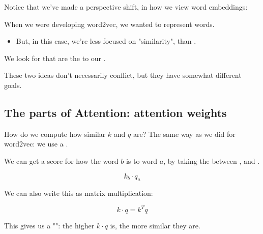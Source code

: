         \phantom{}

        Notice that we've made a perspective shift, in how we view word embeddings:\\

        \begin{concept}
            When we were developing word2vec, we wanted  to represent  words.

            \begin{itemize}
                \item But, in this case, we're less focused on "similarity", than .
            \end{itemize}

            We look for  that are the  to our .

        \end{concept}

        These two ideas don't necessarily conflict, but they have somewhat different goals.

    \phantom{}

    \subsection{The parts of Attention: attention weights}

        How do we compute how similar $k$ and $q$ are? The same way as we did for word2vec: we use a .\\

        \begin{kequation}
            We can get a score for how  the word $b$ is to word $a$, by taking the  between , and .

            \begin{equation*}
                k_b \cdot q_a  
            \end{equation*}

            We can also write this as matrix multiplication:

            \begin{equation*}
                k \cdot q = k^Tq
            \end{equation*}
        \end{kequation}

        This gives us a "": the higher $k \cdot q$ is, the more similar they are.

